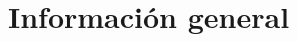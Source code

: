 \documentclass[a4paper,hidelinks]{twentysecondcv}
\begin{document}
% 
% 
% 
% 
% 

\section{Información general}

\end{document}
